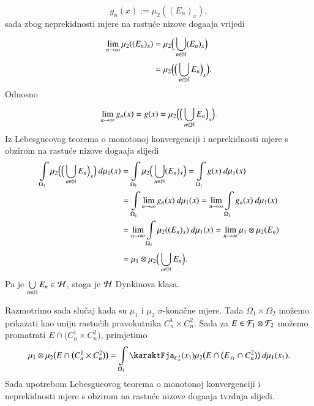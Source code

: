 \begin{rj}[\ref{zad:4.15}]
\begin{enumerate}[label=(\roman*)]
\begin{equation*}
            g_n (x) := \mu_2 ((E_n)_x),
        \end{equation*}
        sada zbog neprekidnosti mjere na rastu\' ce nizove doga\dj aja vrijedi
        \begin{equation*}
            \begin{aligned}
                \lim\limits_{n \to \infty} \mu_2 ((E_n)_x) &= \mu_2 \Big( \bigcup\limits_{n \in \mathbb{N}}^{} (E_n)_x \Big)\\
                &= \mu_2 \Big( \Big( \bigcup\limits_{n \in \mathbb{N}}^{} E_n \Big)_x \Big).
            \end{aligned}
        \end{equation*}
        Odnosno
        \begin{equation*}
            \lim\limits_{n \to \infty} g_n (x) = g (x) = \mu_2 \Big( \Big( \bigcup\limits_{n \in \mathbb{N}}^{} E_n  \Big)_x \Big).
        \end{equation*}
        Iz Lebesgueovog teorema o monotonoj konvergenciji i neprekidnosti mjere s obzirom na rastu\' ce nizove doga\dj aja slijedi
        \begin{equation*}
            \begin{aligned}
                \int\limits_{\Omega_1} \mu_2 \Big( \Big( \bigcup\limits_{n \in \mathbb{N}}^{} E_n \Big)_x \Big) \: d \mu_1 (x) &=  \int\limits_{\Omega_1} \mu_2 \Big( \bigcup\limits_{n \in \mathbb{N}}^{} (E_n)_x \Big) = \int\limits_{\Omega_1} g(x) \: d \mu_1 (x)\\
                &= \int\limits_{\Omega_1} \lim\limits_{n \to \infty} g_n (x) \: d \mu_1 (x) = \lim\limits_{n \to \infty} \int\limits_{\Omega_1} g_n (x) \: d \mu_1 (x)\\
                & = \lim\limits_{n \to \infty} \int\limits_{\Omega_1} \mu_2 ((E_n)_x) \: d \mu_1 (x) = \lim\limits_{n \to \infty} \mu_1 \otimes \mu_2 (E_n)\\
                &= \mu_1 \otimes \mu_2 \Big( \bigcup\limits_{n \in \mathbb{N}}^{} E_n \Big).
            \end{aligned}
        \end{equation*}
        Pa je $\bigcup\limits_{n \in \mathbb{N}}^{} E_n \in \mathcal{H}$, stoga je $\mathcal{H}$ Dynkinova klasa.

        Razmotrimo sada slu\v caj kada su $\mu_1$ i $\mu_2$ $\sigma$-kona\v cne mjere.
        Tada $\Omega_1 \times \Omega_2$ mo\v zemo prikazati kao uniju rastu\' cih pravokutnika $C_n^1 \times C_n^2$.
        Sada za $E \in \mathcal{F}_1 \otimes \mathcal{F}_2$ mo\v zemo promatrati $E \cap \big(C_n^1 \times C_n^2 \big)$, primjetimo
        \begin{equation*}
            \mu_1 \otimes \mu_2 \big(E \cap \big(C_n^1 \times C_n^2 \big) \big) = \int\limits_{\Omega_1} \karaktFja_{C_n^1} (x_1) \mu_2 \big(E \cap \big(E_{x_1} \cap C_n^2 \big) \big) \: d \mu_1 (x_1).
        \end{equation*}
        Sada upotrebom Lebesgueovog teorema o monotonoj konvergenciji i neprekidnosti mjere s obzirom na rastu\' ce nizove doga\dj aja tvrdnja slijedi.


\end{enumerate}
\end{rj}
